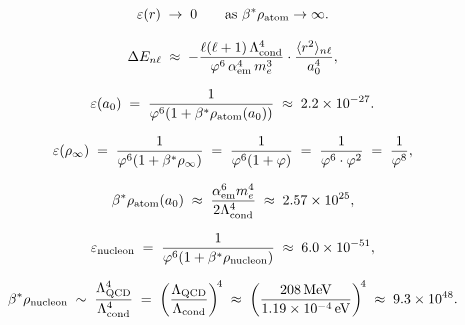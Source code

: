 %
%

\begin{equation}
  \varepsilon(r) \;\to\; 0
  \qquad \text{as } \beta^{*}\rho_{\mathrm{atom}} \to \infty.
\end{equation}

\begin{equation}
  \Delta E_{n\ell}
  \;\approx\; -\frac{\ell(\ell+1)\,\Lambda_{\mathrm{cond}}^4}{\varphi^6\,\alpha_{\mathrm{em}}^4\,m_e^3}
              \cdot\frac{\langle r^2\rangle_{n\ell}}{a_0^4},
  \label{P13:eq:delta_E_chameleon}
\end{equation}

\begin{equation}
  \varepsilon(a_0)
  \;=\; \frac{1}{\varphi^6(1+\beta^{*}\rho_{\mathrm{atom}}(a_0))}
  \;\approx\; 2.2\times10^{-27}.
  \label{P13:eq:eps_a0_value}
\end{equation}

\begin{equation}
  \varepsilon(\rho_{\infty})
  \;=\; \frac{1}{\varphi^6(1+\beta^{*}\rho_{\infty})}
  \;=\; \frac{1}{\varphi^6(1+\varphi)}
  \;=\; \frac{1}{\varphi^6\cdot\varphi^2}
  \;=\; \frac{1}{\varphi^8},
  \label{P13:eq:eps_attractor}
\end{equation}

\begin{equation}
  \beta^{*}\rho_{\rm atom}(a_0)
  \;\approx\; \frac{\alpha_{\mathrm{em}}^6 m_e^4}{2\Lambda_{\mathrm{cond}}^4}
  \;\approx\; 2.57\times10^{25},
  \label{P13:eq:rho_atom_a0}
\end{equation}

\begin{equation}
  \varepsilon_{\mathrm{nucleon}}
  \;=\; \frac{1}{\varphi^6(1+\beta^{*}\rho_{\mathrm{nucleon}})}
  \;\approx\; 6.0\times10^{-51},
\end{equation}

\begin{equation}
  \beta^{*}\rho_{\mathrm{nucleon}}
  \;\sim\; \frac{\Lambda_{\mathrm{QCD}}^4}{\Lambda_{\mathrm{cond}}^4}
  \;=\; \left(\frac{\Lambda_{\mathrm{QCD}}}{\Lambda_{\mathrm{cond}}}\right)^{\!4}
  \;\approx\; \left(\frac{208\,\mathrm{MeV}}{1.19\times10^{-4}\,\mathrm{eV}}\right)^{\!4}
  \;\approx\; 9.3\times10^{48}.
\end{equation}

